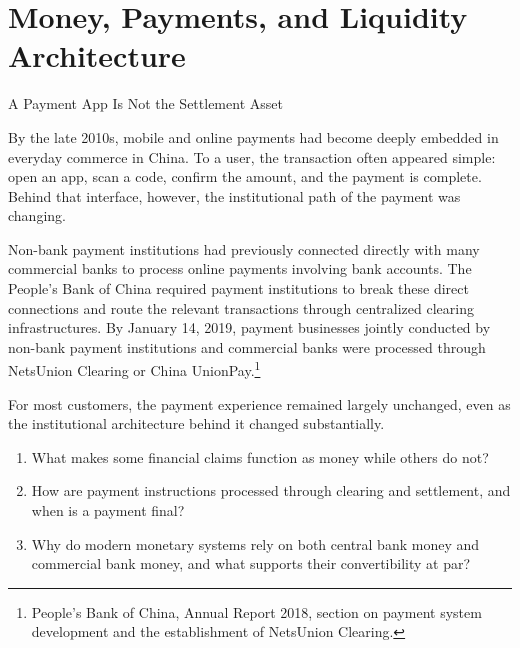 \chapter{Money, Payments, and Liquidity Architecture}
\label{chap:Money_Payments_and_Liquidity_Architecture}

\begin{openingcase}{A Payment App Is Not the Settlement Asset}

By the late 2010s, mobile and online payments had become deeply embedded in everyday commerce in China. To a user, the transaction often appeared simple: open an app, scan a code, confirm the amount, and the payment is complete. Behind that interface, however, the institutional path of the payment was changing.

Non-bank payment institutions had previously connected directly with many commercial banks to process online payments involving bank accounts. The People's Bank of China required payment institutions to break these direct connections and route the relevant transactions through centralized clearing infrastructures. By January 14, 2019, payment businesses jointly conducted by non-bank payment institutions and commercial banks were processed through NetsUnion Clearing or China UnionPay.\footnote{People's Bank of China, Annual Report 2018, section on payment system development and the establishment of NetsUnion Clearing.}

For most customers, the payment experience remained largely unchanged, even as the institutional architecture behind it changed substantially.

\end{openingcase}


\begin{tcolorbox}[
  enhanced,
  colback=FinanceBlue!6,
  colframe=FinanceBlue,
  boxrule=0.6pt,
  sharp corners,
  left=8pt,
  right=8pt,
  top=7pt,
  bottom=7pt,
  before skip=1em,
  after skip=1.6em,
  title=\textbf{Core Questions},
  coltitle=white,
  colbacktitle=FinanceBlue,
  fonttitle=\bfseries,
  attach boxed title to top left={xshift=6pt,yshift=-2mm},
  boxed title style={
    boxrule=0pt,
    sharp corners,
    left=5pt,
    right=5pt,
    top=2pt,
    bottom=2pt
  }
]
\begin{enumerate}[
  leftmargin=*,
  label=\textcolor{FinanceBlue}{\textbf{\arabic*.}},
  itemsep=0.55em,
  topsep=0.2em
]
\item What makes some financial claims function as money while others do not?
\item How are payment instructions processed through clearing and settlement, and when is a payment final?
\item Why do modern monetary systems rely on both central bank money and commercial bank money, and what supports their convertibility at par?
\end{enumerate}
\end{tcolorbox}


